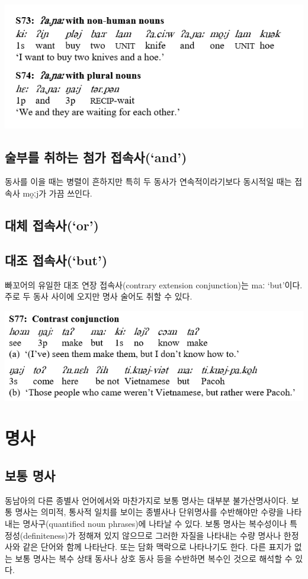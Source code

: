 \includegraphics{Pacoh/src/PacohS73.png}

\subsection{술부를 취하는 첨가 접속사(`and')}
동사를 이을 때는 병렬이 흔하지만 특히 두 동사가 연속적이라기보다 동시적일 때는 접속사 mo̰ːj가 가끔 쓰인다.

\subsection{대체 접속사(`or')}
\omission

\subsection{대조 접속사(`but')}
빠꼬어의 유일한 대조 연장 접속사(contrary extension conjunction)는 maː `but'이다. 주로 두 동사 사이에 오지만 명사 술어도 취할 수 있다.

\includegraphics{Pacoh/src/PacohMaExample.png}


\section{명사}
\subsection{보통 명사}
동남아의 다른 종별사 언어에서와 마찬가지로 보통 명사는 대부분 불가산명사이다. 보통 명사는 의미적, 통사적 일치를 보이는 종별사나 단위명사를 수반해야만 수량을 나타내는 명사구(quantified noun phrases)에 나타날 수 있다.
보통 명사는 복수성이나 특정성(definiteness)가 정해져 있지 않으므로 그러한 자질을 나타내는 수량 명사나 한정사와 같은 단어와 함께 나타난다. 또는 담화 맥락으로 나타나기도 한다. 다른 표지가 없는 보통 명사는 복수 상태 동사나 상호 동사 등을 수반하면 복수인 것으로 해석할 수 있다.

